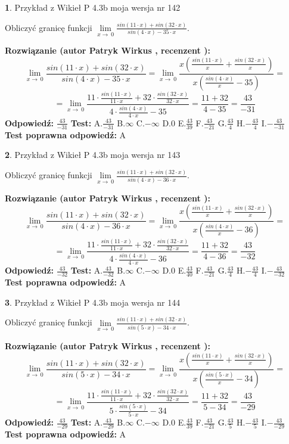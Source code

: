 \documentclass[12pt, a4paper]{article}
\theoremstyle{definition} %
\newtheorem{zad}{}
\newcommand{\zadStart}[1]{\begin{zad}#1\newline}
\newcommand{\zadStop}{\end{zad}}
\newcommand{\rozwStart}[2]{\noindent \textbf{Rozwiązanie (autor #1 , recenzent #2): }\newline}
\newcommand{\rozwStop}{\newline}
\newcommand{\odpStart}{\noindent \textbf{Odpowiedź:}\newline}
\newcommand{\odpStop}{\newline}
\newcommand{\testStart}{\noindent \textbf{Test:}\newline}
\newcommand{\testStop}{\newline}
\newcommand{\kluczStart}{\noindent \textbf{Test poprawna odpowiedź:}\newline}
\newcommand{\kluczStop}{\newline}
\begin{document}
\zadStart{Przykład z Wikieł P 4.3b moja wersja nr 142}


Obliczyć granicę funkcji $\lim\limits_{x\to\ 0}\frac{sin(11 \cdot x)+sin(32 \cdot x)}{sin(4 \cdot x)-35 \cdot x}$.
\zadStop
\rozwStart{Patryk Wirkus}{}
$$\lim\limits_{x\to\ 0}\frac{sin(11 \cdot x)+sin(32 \cdot x)}{sin(4 \cdot x)-35 \cdot x}=\lim\limits_{x\to\ 0}\frac{x(\frac{sin(11 \cdot x)}{x}+\frac{sin(32 \cdot x)}{x})}{x(\frac{sin(4 \cdot x)}{x}-35)}=$$
$$=\lim\limits_{x\to\ 0}\frac{11 \cdot \frac{sin(11 \cdot x)}{11 \cdot x}+32 \cdot \frac{sin(32 \cdot x)}{32 \cdot x}}{4 \cdot \frac{sin(4 \cdot x)}{4 \cdot x}-35}=\frac{11+32}{4-35} = \frac{43}{-31}$$
\rozwStop
\odpStart
$\frac{43}{-31}$
\odpStop
\testStart
A.$\frac{43}{-31}$
B.$\infty$
C.$-\infty$
D.$0$
E.$\frac{43}{39}$
F.$\frac{43}{-21}$
G.$\frac{43}{4}$
H.$-\frac{43}{4}$
I.$-\frac{43}{-31}$
\testStop
\kluczStart
A
\kluczStop



\zadStart{Przykład z Wikieł P 4.3b moja wersja nr 143}


Obliczyć granicę funkcji $\lim\limits_{x\to\ 0}\frac{sin(11 \cdot x)+sin(32 \cdot x)}{sin(4 \cdot x)-36 \cdot x}$.
\zadStop
\rozwStart{Patryk Wirkus}{}
$$\lim\limits_{x\to\ 0}\frac{sin(11 \cdot x)+sin(32 \cdot x)}{sin(4 \cdot x)-36 \cdot x}=\lim\limits_{x\to\ 0}\frac{x(\frac{sin(11 \cdot x)}{x}+\frac{sin(32 \cdot x)}{x})}{x(\frac{sin(4 \cdot x)}{x}-36)}=$$
$$=\lim\limits_{x\to\ 0}\frac{11 \cdot \frac{sin(11 \cdot x)}{11 \cdot x}+32 \cdot \frac{sin(32 \cdot x)}{32 \cdot x}}{4 \cdot \frac{sin(4 \cdot x)}{4 \cdot x}-36}=\frac{11+32}{4-36} = \frac{43}{-32}$$
\rozwStop
\odpStart
$\frac{43}{-32}$
\odpStop
\testStart
A.$\frac{43}{-32}$
B.$\infty$
C.$-\infty$
D.$0$
E.$\frac{43}{40}$
F.$\frac{43}{-21}$
G.$\frac{43}{4}$
H.$-\frac{43}{4}$
I.$-\frac{43}{-32}$
\testStop
\kluczStart
A
\kluczStop



\zadStart{Przykład z Wikieł P 4.3b moja wersja nr 144}


Obliczyć granicę funkcji $\lim\limits_{x\to\ 0}\frac{sin(11 \cdot x)+sin(32 \cdot x)}{sin(5 \cdot x)-34 \cdot x}$.
\zadStop
\rozwStart{Patryk Wirkus}{}
$$\lim\limits_{x\to\ 0}\frac{sin(11 \cdot x)+sin(32 \cdot x)}{sin(5 \cdot x)-34 \cdot x}=\lim\limits_{x\to\ 0}\frac{x(\frac{sin(11 \cdot x)}{x}+\frac{sin(32 \cdot x)}{x})}{x(\frac{sin(5 \cdot x)}{x}-34)}=$$
$$=\lim\limits_{x\to\ 0}\frac{11 \cdot \frac{sin(11 \cdot x)}{11 \cdot x}+32 \cdot \frac{sin(32 \cdot x)}{32 \cdot x}}{5 \cdot \frac{sin(5 \cdot x)}{5 \cdot x}-34}=\frac{11+32}{5-34} = \frac{43}{-29}$$
\rozwStop
\odpStart
$\frac{43}{-29}$
\odpStop
\testStart
A.$\frac{43}{-29}$
B.$\infty$
C.$-\infty$
D.$0$
E.$\frac{43}{39}$
F.$\frac{43}{-21}$
G.$\frac{43}{5}$
H.$-\frac{43}{5}$
I.$-\frac{43}{-29}$
\testStop
\kluczStart
A
\kluczStop
\end{document}
